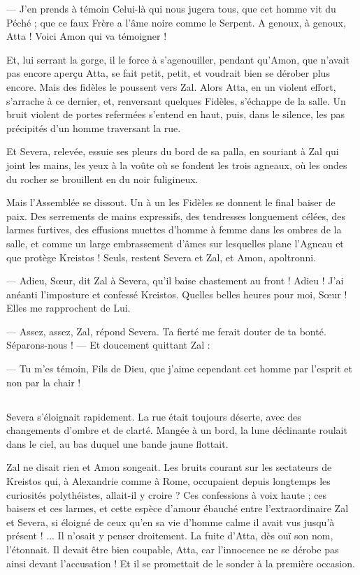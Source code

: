 \documentclass[a4paper, 11pt, oneside, polutonikogreek, french]{article}
\begin{document}
--- J'en prends à témoin Celui-là qui nous jugera tous, que cet homme vit du Péché ; que ce faux Frère a l'âme noire comme le Serpent. A genoux, à genoux, Atta ! Voici Amon qui va témoigner !

Et, lui serrant la gorge, il le force à s'agenouiller, pendant qu'Amon, que n'avait pas encore aperçu Atta, se fait petit, petit, et voudrait bien se dérober plus encore. Mais des fidèles le poussent vers Zal. Alors Atta, en un violent effort, s'arrache à ce dernier, et, renversant quelques Fidèles, s'échappe de la salle. Un bruit violent de portes refermées s'entend en haut, puis, dans le silence, les pas précipités d'un homme traversant la rue.

Et Severa, relevée, essuie ses pleurs du bord de sa palla, en souriant à Zal qui joint les mains, les yeux à la voûte où se fondent les trois agneaux, où les ondes du rocher se brouillent en du noir fuligineux.

Mais l'Assemblée se dissout. Un à un les Fidèles se donnent le final baiser de paix. Des serrements de mains expressifs, des tendresses longuement célées, des larmes furtives, des effusions muettes d'homme à femme dans les ombres de la salle, et comme un large embrassement d'âmes sur lesquelles plane l'Agneau et que protège Kreistos ! Seuls, restent Severa et Zal, et Amon, apoltronni.

--- Adieu, Sœur, dit Zal à Severa, qu'il baise chastement au front ! Adieu ! J'ai anéanti l'imposture et confessé Kreistos. Quelles belles heures pour moi, Sœur ! Elles me rapprochent de Lui.

--- Assez, assez, Zal, répond Severa. Ta fierté me ferait douter de ta bonté. Séparons-nous ! --- Et doucement quittant Zal :

--- Tu m'es témoin, Fils de Dieu, que j'aime cependant cet homme par l'esprit et non par la chair !
\clearpage
\subsection{}
\paragraph{}
Severa s'éloignait rapidement. La rue était toujours déserte, avec des changements d'ombre et de clarté. Mangée à un bord, la lune déclinante roulait dans le ciel, au bas duquel une bande jaune flottait.

Zal ne disait rien et Amon songeait. Les bruits courant sur les sectateurs de Kreistos qui, à Alexandrie comme à Rome, occupaient depuis longtemps les curiosités polythéistes, allait-il y croire ? Ces confessions à voix haute ; ces baisers et ces larmes, et cette espèce d'amour ébauché entre l'extraordinaire Zal et Severa, si éloigné de ceux qu'en sa vie d'homme calme il avait vus jusqu'à présent ! ... Il n'osait y penser droitement. La fuite d'Atta, dès ouï son nom, l'étonnait. Il devait être bien coupable, Atta, car l'innocence ne se dérobe pas ainsi devant l'accusation ! Et il se promettait de le sonder à la première occasion.
\end{document}
